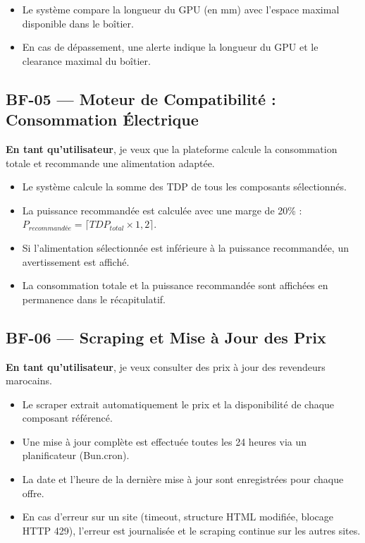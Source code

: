 \documentclass[12pt,a4paper]{article}
\begin{document}
\begin{itemize}[label=\textbullet]
  \item Le système compare la longueur du GPU (en mm) avec l'espace maximal disponible dans le boîtier.
  \item En cas de dépassement, une alerte indique la longueur du GPU et le clearance maximal du boîtier.
\end{itemize}

\subsection{BF-05 — Moteur de Compatibilité : Consommation Électrique}

\textbf{En tant qu'utilisateur}, je veux que la plateforme calcule la consommation totale et recommande une alimentation adaptée.

\begin{itemize}[label=\textbullet]
  \item Le système calcule la somme des TDP de tous les composants sélectionnés.
  \item La puissance recommandée est calculée avec une marge de 20\% : $P_{recommandée} = \lceil TDP_{total} \times 1{,}2 \rceil$.
  \item Si l'alimentation sélectionnée est inférieure à la puissance recommandée, un avertissement est affiché.
  \item La consommation totale et la puissance recommandée sont affichées en permanence dans le récapitulatif.
\end{itemize}

\subsection{BF-06 — Scraping et Mise à Jour des Prix}

\textbf{En tant qu'utilisateur}, je veux consulter des prix à jour des revendeurs marocains.

\begin{itemize}[label=\textbullet]
  \item Le scraper extrait automatiquement le prix et la disponibilité de chaque composant référencé.
  \item Une mise à jour complète est effectuée toutes les 24 heures via un planificateur (Bun.cron).
  \item La date et l'heure de la dernière mise à jour sont enregistrées pour chaque offre.
  \item En cas d'erreur sur un site (timeout, structure HTML modifiée, blocage HTTP 429), l'erreur est journalisée et le scraping continue sur les autres sites.
\end{itemize}
\end{document}
